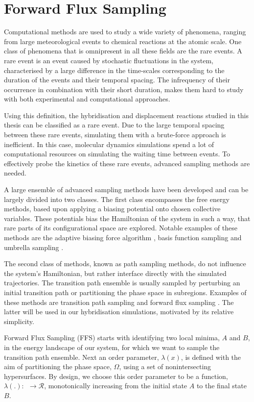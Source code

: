 \section{Forward Flux Sampling}

Computational methods are used to study a wide variety of phenomena, ranging from
large meteorological events to chemical reactions at the atomic scale. One class of
phenomena that is omnipresent in all these fields are the rare events. A rare event is an
event caused by stochastic fluctuations in the system, characterised by a large
difference in the time-scales corresponding to the duration of the events and their
temporal spacing. The infrequency of their occurrence in combination with their short
duration, makes them hard to study with both experimental and computational approaches.

Using this definition, the hybridisation and displacement reactions studied in
this thesis can be classified as a rare event. Due to
the large temporal spacing between these rare events, simulating them with a brute-force
approach is inefficient. In this case, molecular dynamics simulations spend a lot of
computational resources on simulating the waiting time between events. To
effectively probe the kinetics of these rare events, advanced sampling methods are
needed.

A large ensemble of advanced sampling methods have been developed and can be largely
divided into two classes. The first class encompasses the free energy methods, based upon
applying a biasing potential onto chosen collective variables. These potentials bias the
Hamiltonian of the system in such a way, that rare parts of its configurational space are
explored. Notable examples of these methods are the adaptive biasing force algorithm
\cite{Comer2015}, basis function sampling\cite{Whitmer2014} and umbrella sampling
\cite{Kästner2011}.

The second class of methods, known as path sampling methods, do not influence the
system's Hamiltonian, but rather interface directly with the simulated trajectories. The
transition path ensemble is usually sampled by perturbing an initial transition path or
partitioning the phase space in subregions. Examples of these methods are transition
path sampling \cite{Dellago2002} and forward flux sampling \cite{Allen2006}
\cite{Allen2009}.  The latter will be used in our hybridisation simulations, motivated by
its relative simplicity.

Forward Flux Sampling (FFS) starts with identifying two local minima, $A$ and $B$, in the
energy landscape of our system, for which we want to sample the transition path ensemble.
Next an order parameter, $\lambda(x)$, is defined with the aim of partitioning the
phase space, $\Omega$, using a set of nonintersecting hypersurfaces. By design, we
choose this order parameter to be a function, $\lambda(.):\ $\Omega$\ \rightarrow
\mathcal{R}$, monotonically increasing from the initial state $A$ to the final state $B$.

